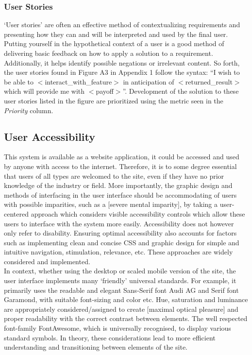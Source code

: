 \documentclass[11pt, english]{article}
\begin{document}
		\subsubsection{User Stories}

	`User stories' are often an effective method of contextualizing requirements and presenting how they can and will be interpreted and used by the final user. Putting yourself in the hypothetical context of a user is a good method of delivering basic feedback on how to apply a solution to a requirement. Additionally, it helps identify possible negations or irrelevant content. So forth, the user stories found in Figure A3 in Appendix 1 follow the syntax: ``I wish to be able to $<$interact\_with\_feature$>$ in anticipation of $<$returned\_result$>$ which will provide me with $<$payoff$>$''. Development of the solution to these user stories listed in the figure are prioritized using the metric seen in the \textit{Priority} column.

	\subsection{User Accessibility}

	This system is available as a website application, it could be accessed and used by anyone with access to the internet. Therefore, it is to some degree essential that users of all types are welcomed to the site, even if they have no prior knowledge of the industry or field. More importantly, the graphic design and methods of interfacing in the user interface should be accommodating of users with possible imparities, such as a [severe mental imparity], by taking a user-centered approach which considers visible accessibility controls which allow these users to interface with the system more easily. Accessibility does not however only refer to disability. Ensuring optimal accessibility also accounts for factors such as implementing clean and concise CSS and graphic design for simple and intuitive navigation, stimulation, relevance, etc. These approaches are widely considered and implemented.\\

	In context, whether using the desktop or scaled mobile version of the site, the user interface implements many `friendly' universal standards. For example, it primarily uses the readable and elegant Sans-Serif font Audi AG and Serif font Garamond, with suitable font-sizing and color etc. Hue, saturation and luminance are appropriately considered/assigned to create [maximal optical pleasure] and proper readability with the correct contrast between elements. The well respected font-family FontAwesome, which is universally recognised, to display various standard symbols. In theory, these considerations lead to more efficient understanding and transitioning between elements of the site.
\end{document}
